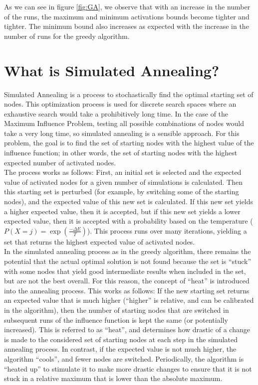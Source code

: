 \documentclass[11pt]{scrartcl} %
\begin{document}
As we can see in figure \ref{fig:GA}, we observe that with an increase in the number of the runs, the maximum and minimum activations bounds become tighter and tighter. The minimum bound also increases as expected with the increase in the number of runs for the greedy algorithm.

\section{What is Simulated Annealing?}

Simulated Annealing is a process to stochastically find the optimal starting set of nodes.  This optimization process is used for discrete search spaces where an exhaustive search would take a prohibitively long time.  In the case of the Maximum Influence Problem, testing all possible combinations of nodes would take a very long time, so simulated annealing is a sensible approach.  For this problem, the goal is to find the set of starting nodes with the highest value of the influence function; in other words, the set of starting nodes with the highest expected number of activated nodes.\\  

The process works as follows: First, an initial set is selected and the expected value of activated nodes for a given number of simulations is calculated.  Then this starting set is perturbed (for example, by switching some of the starting nodes), and the expected value of this new set is calculated.  If this new set yields a higher expected value, then it is accepted, but if this new set yields a lower expected value, then it is accepted with a probability based on the temperature ($P(X=j)=\exp({\frac{-\Delta E}{T}})$).  This process runs over many iterations, yielding a set that returns the highest expected value of activated nodes. \\

In the simulated annealing process as in the greedy algorithm, there remains the potential that the actual optimal solution is not found because the set is “stuck” with some nodes that yield good intermediate results when included in the set, but are not the best overall.  For this reason, the concept of “heat” is introduced into the annealing process.  This works as follows:  
If the new starting set returns an expected value that is much higher (“higher” is relative, and can be calibrated in the algorithm), then the number of starting nodes that are switched in subsequent runs of the influence function is kept the same (or potentially increased).  This is referred to as “heat”, and determines how drastic of a change is made to the considered set of starting nodes at each step in the simulated annealing process. In contrast, if the expected value is not much higher, the algorithm “cools”, and fewer nodes are switched.  Periodically, the algorithm is “heated up” to stimulate it to make more drastic changes to ensure that it is not stuck in a relative maximum that is lower than the absolute maximum.  \\
\end{document}
